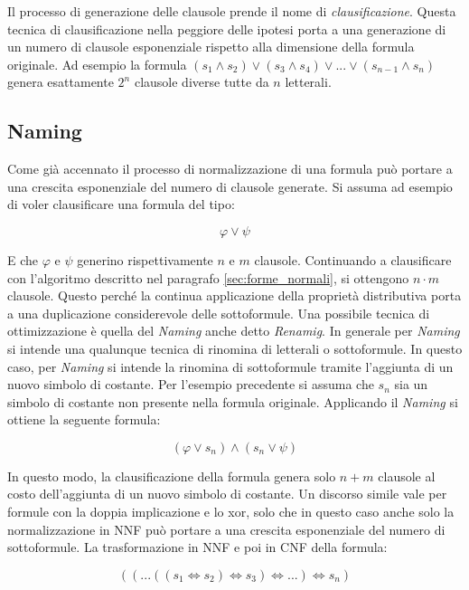 \documentclass[./main.tex]{subfiles}
\begin{document}
Il processo di generazione delle clausole prende il nome di \textit{clausificazione}.
Questa tecnica di clausificazione nella peggiore delle ipotesi porta a una generazione di un numero di clausole esponenziale 
rispetto alla dimensione della formula originale. Ad esempio la formula $(s_1 \land s_2) \lor (s_3 \land s_4) \lor ... \lor (s_{n-1} \land s_{n})$ 
genera esattamente $2^{n}$ clausole diverse tutte da $n$ letterali.



\subsection{Naming}
Come già accennato il processo di normalizzazione di una formula può portare a una crescita esponenziale del numero di clausole generate.
Si assuma ad esempio di voler clausificare una formula del tipo:

$$ \varphi \lor \psi$$

E che $\varphi$ e $\psi$ generino rispettivamente $n$ e $m$ clausole. Continuando a clausificare con l'algoritmo 
descritto nel paragrafo \ref{sec:forme_normali}, si ottengono $n \cdot m$ clausole. 
Questo perché la continua applicazione della proprietà distributiva porta a una duplicazione considerevole delle sottoformule.
Una possibile tecnica di ottimizzazione è quella del \textit{Naming} \cite{naming} anche detto \textit{Renamig}.
In generale per \textit{Naming} si intende una qualunque tecnica di rinomina di letterali o sottoformule.
In questo caso, per \textit{Naming} si intende la rinomina di sottoformule tramite l'aggiunta di un nuovo simbolo di costante.
Per l'esempio precedente si assuma che $s_n$ sia un simbolo di costante non presente nella formula originale.
Applicando il \textit{Naming} si ottiene la seguente formula:

$$ (\varphi \lor s_n) \land (s_n \lor \psi)$$

In questo modo, la clausificazione della formula genera solo $n + m$ clausole al costo dell'aggiunta di un nuovo simbolo di costante.
Un discorso simile vale per formule con la doppia implicazione e lo xor, solo che in questo caso
anche solo la normalizzazione in NNF può portare a una crescita esponenziale del numero di sottoformule.
La trasformazione in NNF e poi in CNF della formula:

$$ ((...((s_1 \Leftrightarrow s_2) \Leftrightarrow s_3) \Leftrightarrow ...) \Leftrightarrow s_n)$$
\end{document}
